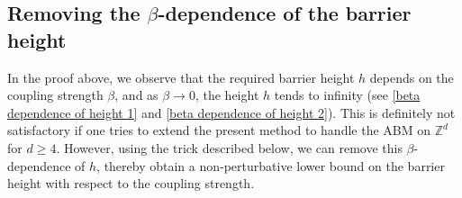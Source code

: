 \documentclass[11pt,reqno,UTF8,twoside]{amsart}
\newcommand{\Z}{\mathbb{Z}}
\theoremstyle{definition}
\numberwithin{equation}{section}
\begin{document}
\subsection{Removing the $\beta$-dependence of the barrier height}\label{remove beta dependent}
In the proof above, we observe that the required barrier height $h$ depends on the coupling strength $\beta$, and as $\beta \to 0$, the height $h$ tends to  infinity (see \eqref{beta dependence of height 1} and \eqref{beta dependence of height 2}).  This is definitely not satisfactory if one tries to extend the  present method to handle the ABM on $\Z^d$ for $d\geq 4$. However, using the trick described below, we can remove this $\beta$-dependence of $h$, thereby obtain  a non‑perturbative lower bound on the barrier height with respect to the  coupling strength.
\end{document}
